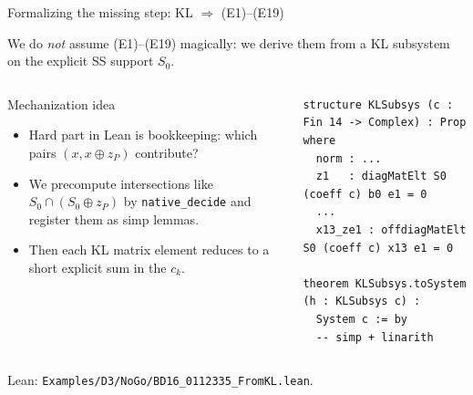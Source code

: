 \documentclass[aspectratio=169,t]{beamer}
\newcommand{\code}[1]{\texttt{\small #1}}
\begin{document}
\begin{frame}[fragile]{Formalizing the missing step: KL $\Rightarrow$ (E1)--(E19)}

We do \emph{not} assume (E1)--(E19) magically: we derive them from a KL subsystem
on the explicit SS support $S_0$.

\begin{columns}[T]
\begin{block}{Mechanization idea}
\begin{itemize}\setlength\itemsep{1pt}
\item Hard part in Lean is bookkeeping: which pairs $(x,x\oplus z_P)$ contribute?
\item We precompute intersections like $S_0\cap(S_0\oplus z_P)$ by \code{native\_decide}
and register them as simp lemmas.
\item Then each KL matrix element reduces to a short explicit sum in the $c_k$.
\end{itemize}
\end{block}

\begin{lstlisting}[style=lean,basicstyle=\ttfamily\scriptsize]
structure KLSubsys (c : Fin 14 -> Complex) : Prop where
  norm : ...
  z1   : diagMatElt S0 (coeff c) b0 e1 = 0
  ...
  x13_ze1 : offdiagMatElt S0 (coeff c) x13 e1 = 0

theorem KLSubsys.toSystem (h : KLSubsys c) :
  System c := by
  -- simp + linarith
\end{lstlisting}
\end{columns}

\textcolor{Slate}{\small Lean: \code{Examples/D3/NoGo/BD16\_0112335\_FromKL.lean}.}
\end{frame}
\end{document}

